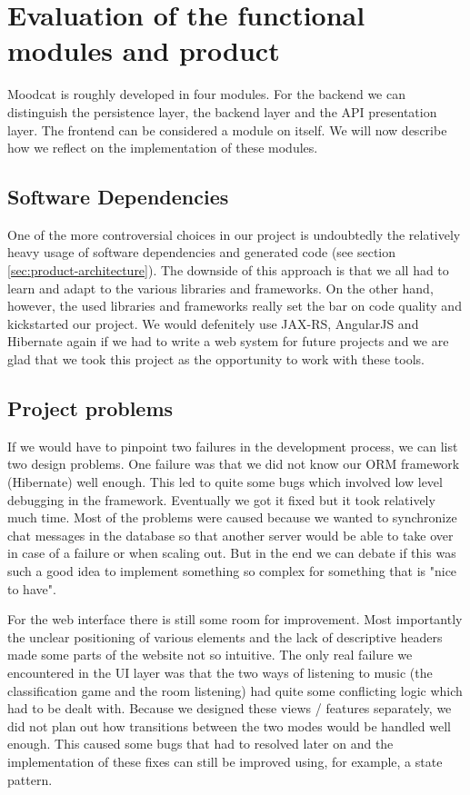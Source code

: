 
\chapter{Evaluation of the functional modules and product}

Moodcat is roughly developed in four modules.
For the backend we can distinguish the persistence layer, the backend layer and the API presentation layer.
The frontend can be considered a module on itself.
We will now describe how we reflect on the implementation of these modules.

\section{Software Dependencies}
One of the more controversial choices in our project is undoubtedly the relatively heavy usage of software dependencies and generated code (see section \ref{sec:product-architecture}).
The downside of this approach is that we all had to learn and adapt to the various libraries and frameworks.
On the other hand, however, the used libraries and frameworks really set the bar on code quality and kickstarted our project.
We would defenitely use JAX-RS, AngularJS and Hibernate again if we had to write a web system for future projects and we are glad that we took this project as the opportunity to work with these tools.

\section{Project problems}
If we would have to pinpoint two failures in the development process, we can list two design problems.
One failure was that we did not know our ORM framework (Hibernate) well enough.
This led to quite some bugs which involved low level debugging in the framework.
Eventually we got it fixed but it took relatively much time.
Most of the problems were caused because we wanted to synchronize chat messages in the database so that another server would be able to take over in case of a failure or when scaling out.
But in the end we can debate if this was such a good idea to implement something so complex for something that is "nice to have".

For the web interface there is still some room for improvement.
Most importantly the unclear positioning of various elements and the lack of descriptive headers made some parts of the website not so intuitive.
The only real failure we encountered in the UI layer was that the two ways of listening to music (the classification game and the room listening) had quite some conflicting logic which had to be dealt with.
Because we designed these views / features separately, we did not plan out how transitions between the two modes would be handled well enough.
This caused some bugs that had to resolved later on and the implementation of these fixes can still be improved using, for example, a state pattern.

